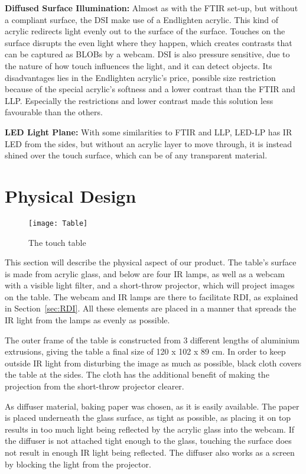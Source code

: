 \textbf{Diffused Surface Illumination:} Almost as with the FTIR set-up, but without a compliant surface, the DSI make use of a Endlighten acrylic. This kind of acrylic redirects light evenly out to the surface of the surface.  Touches on the surface disrupts the even light where they happen, which creates contrasts that can be captured as BLOBs by a webcam. DSI is also pressure sensitive, due to the nature of how touch influences the light, and it can detect objects. Its disadvantages lies in the Endlighten acrylic's price, possible size restriction because of the special acrylic's softness and a lower contrast than the FTIR and LLP. Especially the restrictions and lower contrast made this solution less favourable than the others.

\textbf{LED Light Plane:} With some similarities to FTIR and LLP, LED-LP has IR LED from the sides, but without an acrylic layer to move through, it is instead shined over the touch surface, which can be of any transparent material.

\section{Physical Design} 
\begin{figure} [!h]
\centering \texttt{[image: Table]}
 \caption{The touch table \label{Fig:Table}}
\end{figure}
This section will describe the physical aspect of our product.
The table's surface is made from acrylic glass, and below are four IR lamps, as well as a webcam with a visible light filter, and a short-throw projector, which will project images on the table. The webcam and IR lamps are there to facilitate RDI, as explained in Section~\ref{sec:RDI}. All these elements are placed in a manner that spreads the IR light from the lamps as evenly as possible.

The outer frame of the table is constructed from 3 different lengths of aluminium extrusions, giving the table a final size of 120 x 102 x 89 cm.
In order to keep outside IR light from disturbing the image as much as possible, black cloth covers the table at the sides. The cloth has the additional benefit of making the projection from the short-throw projector clearer. 

As diffuser material, baking paper was chosen, as it is easily available. The paper is placed underneath the glass surface, as tight as possible, as placing it on top results in too much light being reflected by the acrylic glass into the webcam. If the diffuser is not attached tight enough to the glass, touching the surface does not result in enough IR light being reflected. The diffuser also works as a screen by blocking the light from the projector. 

